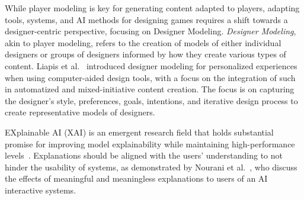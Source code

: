 While player modeling is key for generating content adapted to players, adapting tools, systems, and AI methods for designing games requires a shift towards a designer-centric perspective, focusing on Designer Modeling. \emph{Designer Modeling}, akin to player modeling, refers to the creation of models of either individual designers or groups of designers informed by how they create various types of content. Liapis et al.~ introduced designer modeling for personalized experiences when using computer-aided design tools, with a focus on the integration of such in automatized and mixed-initiative content creation. The focus is on capturing the designer's style, preferences, goals, intentions, and iterative design process to create representative models of designers.








EXplainable AI (XAI) is an emergent research field that holds substantial promise for improving model explainability while maintaining high-performance levels~. Explanations should be aligned with the users' understanding to not hinder the usability of systems, as demonstrated by Nourani et al.~, who discuss the effects of meaningful and meaningless explanations to users of an AI interactive systems.

